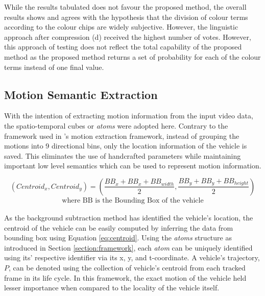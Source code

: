 \vspace{-2em}

While the results tabulated does not favour the proposed method, the overall results shows and agrees with the hypothesis that the division of colour terms according to the colour chips are widely subjective. However, the linguistic approach after compression (d) received the highest number of votes.
However, this approach of testing does not reflect the total capability of the proposed method as the proposed method returns a set of probability for each of the colour terms instead of one final value.



\subsection{Motion Semantic Extraction}

With the intention of extracting motion information from the input video data, the spatio-temporal cubes or \emph{atoms} were adopted here. Contrary to the framework used in \versionOneExt's motion extraction framework, instead of grouping the motions into 9 directional bins, only the location information of the vehicle is saved. This eliminates the use of handcrafted parameters while maintaining important low level semantics which can be used to represent motion information. 


\begin{equation}
\label{eq:centroid}
(Centroid_x, Centroid_y) = (\frac{BB_{x}+BB_{x}+BB_{width}}{2} , \frac{BB_{y}+BB_{y}+BB_{height}}{2})
\end{equation}
\vspace{-2em}
\begin{align*}
    \text{where BB is the Bounding Box of the vehicle}
\end{align*}

As the background subtraction method has identified the vehicle's location, the centroid of the vehicle can be easily computed by inferring the data from bounding box using Equation \ref{eq:centroid}. Using the \emph{atoms} structure as introduced in Section \ref{section:framework}, each \emph{atom} can be uniquely identified using its' respective identifier via its x, y, and t-coordinate. A vehicle's trajectory, $P$, can be denoted using the collection of  vehicle's centroid from each tracked frame in its life cycle. In this framework, the exact motion of the vehicle held lesser importance when compared to the locality of the vehicle itself. 

